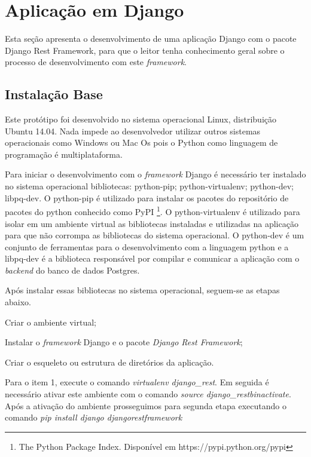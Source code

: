   
\section{Aplicação em Django}
\label{desenvolvimento-django}

  Esta seção apresenta o desenvolvimento de uma aplicação Django com o pacote Django Rest Framework, para que o 
  leitor tenha conhecimento geral sobre o processo de desenvolvimento com este \textit{framework}. 
  
  
\subsection{Instalação Base}

 
  Este protótipo foi desenvolvido no sistema operacional Linux, distribuição Ubuntu 14.04. Nada impede ao desenvolvedor 
  utilizar outros sistemas operacionais como Windows ou Mac Os pois o Python como linguagem de programação 
  é multiplataforma. 
  
  Para iniciar o desenvolvimento com o \textit{framework} Django é necessário ter instalado no sistema operacional
  bibliotecas: python-pip; python-virtualenv; python-dev; libpq-dev. O python-pip é utilizado para instalar os 
  pacotes do repositório de pacotes do python conhecido como PyPI \footnote[9]{The Python Package Index. Disponível em https://pypi.python.org/pypi}. 
  O python-virtualenv é utilizado para isolar em um ambiente virtual as bibliotecas instaladas e utilizadas na aplicação 
  para que não corrompa as bibliotecas do sistema operacional. O python-dev é um conjunto de ferramentas para o 
  desenvolvimento com a linguagem python e a libpq-dev é a biblioteca responsável por compilar e comunicar a aplicação 
  com o \textit{backend} do banco de dados Postgres.
  
  Após instalar essas bibliotecas no sistema operacional, seguem-se as etapas abaixo.
  
  \begin{compactitem}
    \item[1)] Criar o ambiente virtual;
    \item[2)] Instalar o \textit{framework} Django e o pacote \textit{Django Rest Framework};
    \item[3)] Criar o esqueleto ou estrutura de diretórios da aplicação.
  \end{compactitem}
  
  Para o item 1, execute o comando \textit{virtualenv django\_rest}. Em seguida é necessário ativar este ambiente com o comando
  \textit{source django\_rest\/bin\/activate}. Após a ativação do ambiente prosseguimos para segunda etapa executando o comando
  \textit{ pip install django djangorestframework}
  
